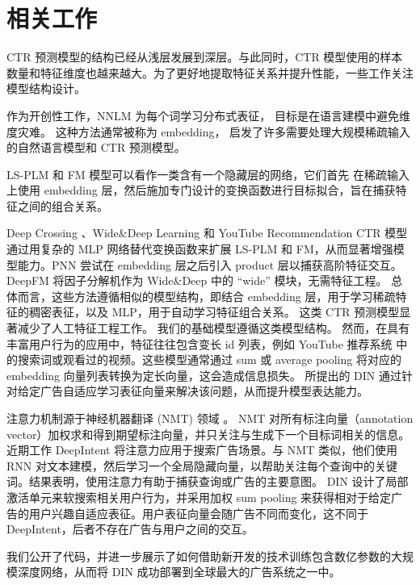 \section{相关工作}
CTR 预测模型的结构已经从浅层发展到深层。与此同时，CTR 模型使用的样本数量和特征维度也越来越大。为了更好地提取特征关系并提升性能，一些工作关注模型结构设计。

作为开创性工作，NNLM \cite{bengio:nnlm} 为每个词学习分布式表征，
目标是在语言建模中避免维度灾难。
这种方法通常被称为 embedding，
启发了许多需要处理大规模稀疏输入的自然语言模型和 CTR 预测模型。

LS-PLM \cite{MLR} 和 FM \cite{rendle:fm} 模型可以看作一类含有一个隐藏层的网络，它们首先
 在稀疏输入上使用 embedding 层，然后施加专门设计的变换函数进行目标拟合，旨在捕获特征之间的组合关系。

Deep Crossing \cite{deep_crossing}、Wide\&Deep Learning \cite{widedeep} 和 YouTube Recommendation CTR 模型 \cite{youtube:recommend} 通过用复杂的 MLP 网络替代变换函数来扩展 LS-PLM 和 FM，从而显著增强模型能力。PNN\cite{PNN} 尝试在 embedding 层之后引入 product 层以捕获高阶特征交互。DeepFM\cite{DeepFM} 将因子分解机作为 Wide\&Deep \cite{widedeep} 中的 ``wide'' 模块，无需特征工程。
总体而言，这些方法遵循相似的模型结构，即结合 embedding 层，用于学习稀疏特征的稠密表征，以及 MLP，用于自动学习特征组合关系。
这类 CTR 预测模型显著减少了人工特征工程工作。%
我们的基础模型遵循这类模型结构。
然而，在具有丰富用户行为的应用中，特征往往包含变长 id 列表，例如 YouTube 推荐系统 \cite{youtube:recommend} 中的搜索词或观看过的视频。这些模型通常通过 sum 或 average pooling 将对应的 embedding 向量列表转换为定长向量，这会造成信息损失。
所提出的 DIN 通过针对给定广告自适应学习表征向量来解决该问题，从而提升模型表达能力。

注意力机制源于神经机器翻译 (NMT) 领域 \cite{bengio:attention}。
NMT 对所有标注向量（annotation vector）加权求和得到期望标注向量，并只关注与生成下一个目标词相关的信息。
近期工作 DeepIntent \cite{deep_intent} 将注意力应用于搜索广告场景。与 NMT 类似，他们使用 RNN\cite{rnn} 对文本建模，然后学习一个全局隐藏向量，以帮助关注每个查询中的关键词。结果表明，使用注意力有助于捕获查询或广告的主要意图。
DIN 设计了局部激活单元来软搜索相关用户行为，并采用加权 sum pooling 来获得相对于给定广告的用户兴趣自适应表征。用户表征向量会随广告不同而变化，这不同于 DeepIntent，后者不存在广告与用户之间的交互。

我们公开了代码，并进一步展示了如何借助新开发的技术训练包含数亿参数的大规模深度网络，从而将 DIN 成功部署到全球最大的广告系统之一中。
